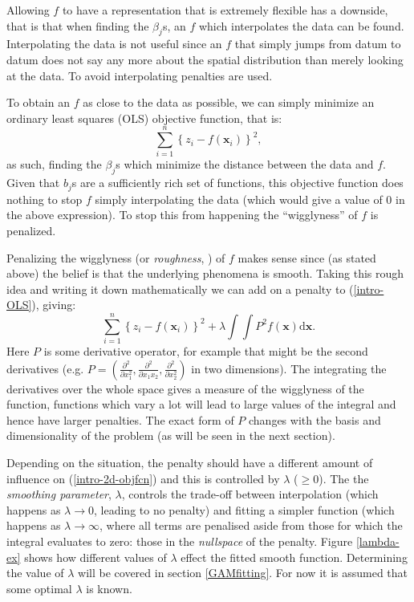 Allowing $f$ to have a representation that is extremely flexible has a downside, that is that when finding the $\beta_j$s, an $f$ which interpolates the data can be found. Interpolating the data is not useful since an $f$ that simply jumps from datum to datum does not say any more about the spatial distribution than merely looking at the data. To avoid interpolating penalties are used.

To obtain an $f$ as close to the data as possible, we can simply minimize an ordinary least squares (OLS) objective function, that is:
\begin{equation}
\sum_{i=1}^n \left \{ z_i - f(\mathbf{x}_i) \right \}^2,
\label{intro-OLS}
\end{equation}
as such, finding the $\beta_j$s which minimize the distance between the data and $f$. Given that $b_j$s are a sufficiently rich set of functions, this objective function does nothing to stop $f$ simply interpolating the data (which would give a value of 0 in the above expression). To stop this from happening the ``wigglyness'' of $f$ is penalized.

Penalizing the wigglyness (or \textit{roughness}, \cite{rwc}) of $f$ makes sense since (as stated above) the belief is that the underlying phenomena is smooth. Taking this rough idea and writing it down mathematically we can add on a penalty to (\ref{intro-OLS}), giving:
\begin{equation}
\sum_{i=1}^n \left \{ z_i - f(\mathbf{x}_i) \right \}^2 +  \lambda \int\int P^2 f(\mathbf{x}) \text{d}\mathbf{x}.
\label{intro-2d-objfcn}
\end{equation}
Here $P$ is some derivative operator, for example that might be the second derivatives (e.g. $P=\left ( \frac{\partial^2}{\partial x_1^2}, \frac{\partial^2}{\partial x_1 x_2}, \frac{\partial^2}{\partial x_2^2}\right )$ in two dimensions). The integrating the derivatives over the whole space gives a measure of the wigglyness of the function, functions which vary a lot will lead to large values of the integral and hence have larger penalties. The exact form of $P$ changes with the basis and dimensionality of the problem (as will be seen in the next section).

Depending on the situation, the penalty should have a different amount of influence on (\ref{intro-2d-objfcn}) and this is controlled by $\lambda$ ($\geq0$). The the \textit{smoothing parameter}, $\lambda$, controls the trade-off between interpolation (which happens as $\lambda \rightarrow 0$, leading to no penalty) and fitting a simpler function (which happens as $\lambda \rightarrow \infty$, where all terms are penalised aside from those for which the integral evaluates to zero: those in the \textit{nullspace} of the penalty. Figure \ref{lambda-ex} shows how different values of $\lambda$ effect the fitted smooth function. Determining the value of $\lambda$ will be covered in section \ref{GAMfitting}. For now it is assumed that some optimal $\lambda$ is known.

